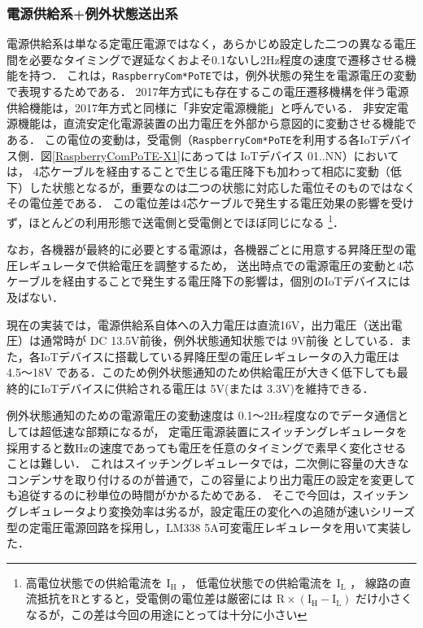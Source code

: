 


\subsubsection{電源供給系+例外状態送出系}


電源供給系は単なる定電圧電源ではなく，あらかじめ設定した二つの異なる電圧間を必要なタイミングで遅延なくおよそ0.1ないし2Hz程度の速度で遷移させる機能を持つ．
これは，{\tt Raspberry\-Com*PoTE}では，例外状態の発生を電源電圧の変動で表現するためである．
2017年方式にも存在するこの電圧遷移機構を伴う電源供給機能は，2017年方式と同様に「非安定電源機能」と呼んでいる．
非安定電源機能は，直流安定化電源装置の出力電圧を外部から意図的に変動させる機能である．
この電位の変動は，受電側（{\tt Raspberry\-Com*PoTE}を利用する各IoTデバイス側．図\ref{RaspberryComPoTE-X1}にあっては IoTデバイス 01..NN）においては，
4芯ケーブルを経由することで生じる電圧降下も加わって相応に変動（低下）した状態となるが，重要なのは二つの状態に対応した電位そのものではなくその電位差である．
この電位差は4芯ケーブルで発生する電圧効果の影響を受けず，ほとんどの利用形態で送電側と受電側とでほぼ同じになる
\footnote{高電位状態での供給電流を $\text{I}_\text{H}$ ，
  低電位状態での供給電流を $\text{I}_\text{L}$ ，
  線路の直流抵抗をRとすると，受電側の電位差は厳密には
  $ \text{R} \times (\text{I}_\text{H} - \text{I}_\text{L}) $
  だけ小さくなるが，この差は今回の用途にとっては十分に小さい}．

なお，各機器が最終的に必要とする電源は，各機器ごとに用意する昇降圧型の電圧レギュレータで供給電圧を調整するため，
送出時点での電源電圧の変動と4芯ケーブルを経由することで発生する電圧降下の影響は，個別のIoTデバイスには及ばない．

現在の実装では，電源供給系自体への入力電圧は直流16V，出力電圧（送出電圧）は通常時が DC 13.5V前後，例外状態通知状態では 9V前後 としている．また，各IoTデバイスに搭載している昇降圧型の電圧レギュレータの入力電圧は 4.5〜18V である．このため例外状態通知のため供給電圧が大きく低下しても最終的にIoTデバイスに供給される電圧は 5V(または 3.3V)を維持できる．

例外状態通知のための電源電圧の変動速度は 0.1〜2Hz程度なのでデータ通信としては超低速な部類になるが，
定電圧電源装置にスイッチングレギュレータを採用すると数Hzの速度であっても電圧を任意のタイミングで素早く変化させることは難しい．
これはスイッチングレギュレータでは，二次側に容量の大きなコンデンサを取り付けるのが普通で，この容量により出力電圧の設定を変更しても追従するのに秒単位の時間がかかるためである．
そこで今回は，スイッチングレギュレータより変換効率は劣るが，設定電圧の変化への追随が速いシリーズ型の定電圧電源回路を採用し，LM338 5A可変電圧レギュレータ\cite{data:LM338}を用いて実装した．


